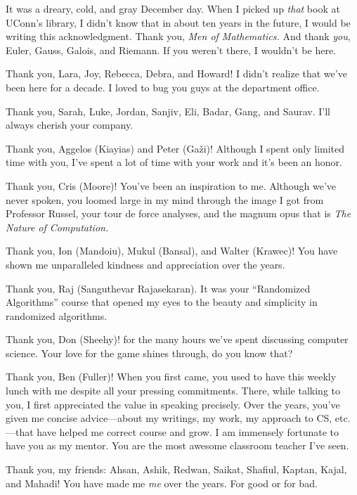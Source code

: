   It was a dreary, cold, and gray December day. When I picked up \emph{that} book at UConn's library, 
  I didn't know that in about ten years in the future, 
  I would be writing this acknowledgment. 
  Thank you, \emph{Men of Mathematics.} And thank \emph{you}, 
  Euler, Gauss, Galois, and Riemann. If you weren't there, 
  I wouldn't be here.

  \AckBreak
  Thank you, Lara, Joy, Rebecca, Debra, and Howard! I didn't realize that we've been here for a decade. 
  I loved to bug you guys at the department office. 

  Thank you, Sarah, Luke, Jordan, Sanjiv, Eli, Badar, Gang, and Saurav. I'll always cherish your company.


  \AckBreak
  Thank you, Aggelos (Kiayias) and Peter (Ga\v{z}i)! 
  Although I spent only limited time with you, 
  I've spent a lot of time with your work 
  and it's been an honor.

  Thank you, Cris (Moore)! You've been an inspiration to me. 
  Although we've never spoken, 
  you loomed large in my mind through the image I got from Professor Russel,
  your tour de force analyses, 
  and the magnum opus that is \emph{The Nature of Computation.}

  Thank you, Ion (Mandoiu), Mukul (Bansal), and Walter (Krawec)! 
  You have shown me unparalleled kindness and appreciation over the years.

  Thank you, Raj (Sanguthevar Rajasekaran). 
  It was your ``Randomized Algorithms'' course that 
  opened my eyes to the beauty and simplicity 
  in randomized algorithms.

  Thank you, Don (Sheehy)! for the many hours we've spent discussing 
  computer science. 
  Your love for the game shines through, do you know that? 

  Thank you, Ben (Fuller)! 
  When you first came, 
  you used to have this weekly lunch with me 
  despite all your pressing commitments. 
  There, while talking to you, 
  I first appreciated the value in speaking precisely. 
  Over the years, 
  you've given me concise advice---about my writings, my work, my approach to CS, etc.---that 
  have helped me correct course and grow. 
  I am immensely fortunate to have you as my mentor.
  You are the most awesome classroom teacher I've seen.


  \AckBreak
  Thank you, my friends: Ahsan, Ashik, Redwan, Saikat, Shafiul, Kaptan, Kajal, and Mahadi! 
  You have made me \emph{me} over the years. For good or for bad.

